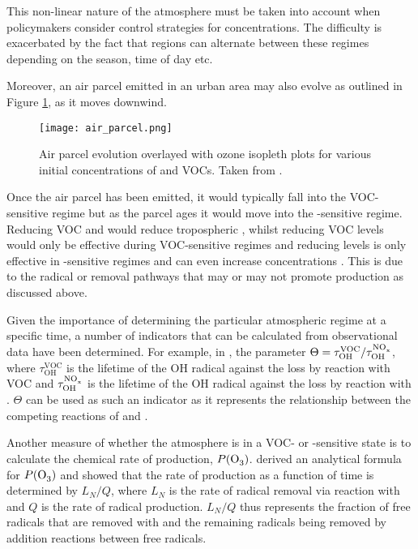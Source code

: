 This non-linear nature of the atmosphere must be taken into account when policymakers consider control strategies for  
concentrations. The difficulty is exacerbated by the fact that regions can alternate between these regimes depending on the 
season, time of day etc. 

Moreover, an air parcel emitted in an urban area may also evolve as outlined in Figure \ref{f:air_parcel}, as it moves 
downwind. 
\begin{figure}
	\begin{center}
		\texttt{[image: air\_parcel.png]}
		\caption{Air parcel evolution overlayed with ozone isopleth plots for various initial concentrations of  and VOCs. Taken from \citep{Sillman:1999}.}
		\label{f:air_parcel}
	\end{center}
\end{figure}
Once the air parcel has been emitted, it would typically fall into the VOC-sensitive regime but as the parcel ages it would 
move into the -sensitive regime. Reducing VOC and  would reduce tropospheric , whilst reducing VOC 
levels would only be effective during VOC-sensitive regimes and reducing  levels is only effective in 
-sensitive regimes and can even increase  concentrations \citep{Sillman:1999}. This is due to the radical or 
 removal pathways that may or may not promote  production as discussed above.

Given the importance of determining the particular atmospheric regime at a specific time, a number of indicators that can be 
calculated from observational data have been determined. For example, in \citep{Kirchner:2001}, the parameter 
$\Theta = \tau^{\text{VOC}}_{\text{OH}} / \tau^{\ce{NO_x}}_{\text{OH}}$, where $\tau^{\text{VOC}}_{\text{OH}}$ is the lifetime 
of the OH radical against the loss by reaction with VOC and $\tau^{\ce{NO_x}}_{\text{OH}}$ is the lifetime of the OH radical 
against the loss by reaction with . $\Theta$ can be used as such an indicator as it represents the relationship 
between the competing reactions of  and .

Another measure of whether the atmosphere is in a VOC- or -sensitive state is to calculate the chemical rate of 
 production, $P(\ce{O3})$. \citep{Kleinman:2005} derived an analytical formula for $P(\ce{O3})$ and showed that the rate 
of  production as a function of time is determined by $L_N/Q$, where $L_N$ is the rate of radical removal via reaction 
with  and $Q$ is the rate of radical production. $L_N/Q$ thus represents the fraction of free radicals that are 
removed with  and the remaining radicals being removed by addition reactions between free radicals.

